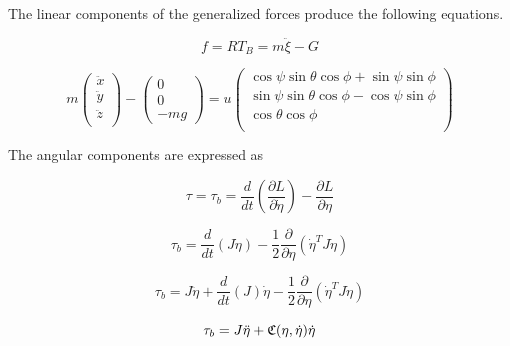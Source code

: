 \noindent The linear components of the generalized forces produce the following equations.

\begin{equation}
    \label{linforce}
    f =  R  T_B = m \ddot{ \xi} -  G
\end{equation}


\begin{equation}
    m\left(\begin{array}{c}
      \ddot{x}\\
      \ddot{y}\\
      \ddot{z}\\
    \end{array}\right)
    - \left( \begin{array}{c}
        0\\
        0\\
        -m g  
      \end{array} \right)
      =u
     \left(
    \begin{array}{c}
     \cos{\psi}\sin{\theta}\cos{\phi} + \sin{\psi}\sin{\phi} \\
     \sin{\psi}\sin{\theta}\cos{\phi} - \cos{\psi}\sin{\phi} \\
     \cos{\theta} \cos{\phi} \\
    \end{array}
    \right)
\end{equation}


\noindent The angular components are expressed as

\begin{equation}
    \tau = \tau_b =\frac{d}{dt} \left( \frac{\partial  L} {\partial \dot{\eta}}\right) - \frac{\partial  L}{\partial \eta}
\end{equation}

\begin{equation}
    \tau_b =\frac{d}{dt} ( J \dot{\eta} ) - \frac{1}{2} \frac{\partial}{\partial \eta} ( \dot{\eta}^T J \dot{\eta}  ) 
\end{equation}

\begin{equation}
    \tau_b =J \ddot{\eta} + \frac{d}{dt}(J) \dot{\eta} - \frac{1}{2} \frac{\partial}{\partial \eta} ( \dot{\eta}^T J \dot{\eta}  ) 
\end{equation}

\begin{equation}
    \tau_b =  J \ddot{\eta} + \mathfrak{C}(\eta,\dot{\eta}) \dot{\eta} 
\end{equation}

